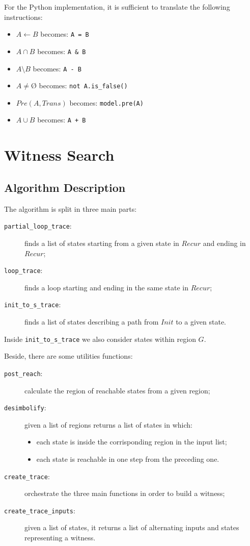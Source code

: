 \documentclass[12pt]{article}
\newcommand{\nothing}{\text{\O}}
\begin{document}
    \noindent For the Python implementation, it is sufficient to translate the following instructions:
    \begin{itemize}
        \item $A \leftarrow B$ becomes: \texttt{A = B}
        \item $A \cap B$ becomes: \texttt{A & B}
        \item $A \setminus B$ becomes: \texttt{A - B}
        \item $A \neq \nothing$ becomes: \texttt{not A.is_false()}
        \item $Pre(A, Trans)$ becomes: \texttt{model.pre(A)}
        \item $A \cup B$ becomes: \texttt{A + B}
    \end{itemize}

    \section{Witness Search}
    \subsection{Algorithm Description}
    The algorithm is split in three main parts:
    \begin{description}
        \item[\texttt{partial\_loop\_trace}:] finds a list of states starting from a given state in $Recur$ and ending in $Recur$;
        \item[\texttt{loop\_trace}:] finds a loop starting and ending in the same state in $Recur$;
        \item[\texttt{init\_to\_s\_trace}:] finds a list of states describing a path from $Init$ to a given state.
    \end{description}
    Inside \texttt{init\_to\_s\_trace} we also consider states within region $G$.

    Beside, there are some utilities functions:
    \begin{description} 
        \item[\texttt{post\_reach}:] calculate the region of reachable states from a given region;
        \item[\texttt{desimbolify}:] given a list of regions returns a list of states in which:
        \begin{itemize}
            \item each state is inside the corrisponding region in the input list;
            \item each state is reachable in one step from the preceding one.
        \end{itemize}
        \item[\texttt{create\_trace}:] orchestrate the three main functions in order to build a witness;
        \item[\texttt{create\_trace\_inputs}:] given a list of states, it returns a list of alternating inputs and states representing a witness.
    \end{description}
\end{document}
